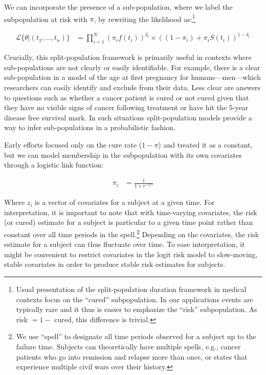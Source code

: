 We can incorporate the presence of a sub-population, where we label the
subpopulation at risk with \(\pi\), by rewriting the likelihood
as:\footnote{Usual presentation of the split-population duration framework in medical contexts focus on the ``cured'' subpopulation. In our applications events are typically rare and it thus is easier to emphasize the ``risk'' subpopulation. As risk $= 1 - $ cured, this difference is trivial.}

\begin{align}
\mathcal{L}\{\theta|(t_{1}, \dots, t_{n})\} &= \prod_{i=1}^{N} \left(\pi_i f(t_i)\right)^{\delta_i} \times  \left((1-\pi_i) + \pi_i S(t_i)\right)^{1-\delta_i}
\end{align}

Crucially, this split-population framework is primarily useful in
contexts where sub-populations are not clearly or easily identifiable.
For example, there is a clear sub-population in a model of the age at
first pregnancy for humans---men---which researchers can easily identify
and exclude from their data. Less clear are answers to questions such as
whether a cancer patient is cured or not cured given that they have no
visible signs of cancer following treatment or have hit the 5-year
disease free survival mark. In such situations split-population models
provide a way to infer sub-populations in a probabilistic fashion.

Early efforts focused only on the cure rate (\(1 - \pi\)) and treated it
as a constant, but we can model membership in the subpopulation with its
own covariates through a logistic link function:

\begin{align}
\pi_i &= \frac{1}{1 + e^{-z_i \gamma}}
\end{align}

Where \(z_i\) is a vector of covariates for a subject at a given time.
For interpretation, it is important to note that with time-varying
covariates, the risk (or cured) estimate for a subject is particular to
a given time point rather than constant over all time periods in the
spell.\footnote{We use ``spell'' to designate all time periods observed for a subject up to the failure time. Subjects can theoretically have multiple spells, e.g., cancer patients who go into remission and relapse more than once, or states that experience multiple civil wars over their history.}
Depending on the covariates, the risk estimate for a subject can thus
fluctuate over time. To ease interpretation, it might be convenient to
restrict covariates in the logit risk model to slow-moving, stable
covariates in order to produce stable risk estimates for subjects.

